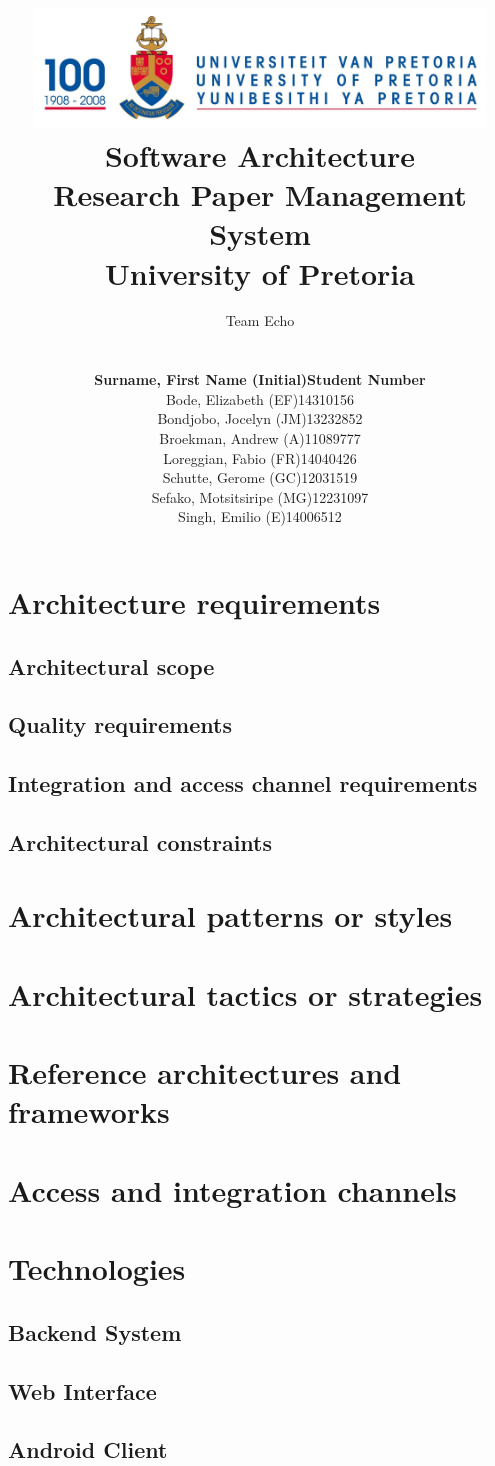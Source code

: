 \documentclass[a4paper,10pt]{article}
\title{\includegraphics[width=12cm]{Eeufeeslogo.jpg} \\
       Software Architecture \\
       Research Paper Management System \\
       \vspace{0.5cm}
       University of Pretoria \\
       \vspace{1.0cm}
       }
\date{}
\author{Team Echo\\
	\vspace{0.5cm} \\
	\begin{tabu} to \textwidth { X[l] X[l]}
		\hline
		\textbf{Surname, First Name (Initial)}	& \textbf{Student Number}	\\ \hline \hline
		Bode, Elizabeth (EF)			& 14310156		\\ \hline
		Bondjobo, Jocelyn (JM)		& 13232852		\\ \hline
		Broekman, Andrew (A)		& 11089777		\\ \hline
		Loreggian, Fabio (FR)			& 14040426		\\ \hline
		Schutte, Gerome (GC)		& 12031519		\\ \hline
		Sefako, Motsitsiripe (MG)		& 12231097		\\ \hline
		Singh, Emilio (E)			& 14006512		\\ \hline
		\hline
	\end{tabu}}
\begin{document}
\maketitle
\thispagestyle{empty}
\clearpage

\newpage
{}
\thispagestyle{empty}
\tableofcontents
\clearpage

\newpage
{}

\section{Architecture requirements}
\subsection{Architectural scope}
\subsection{Quality requirements}
\subsection{Integration and access channel requirements}
\subsection{Architectural constraints}

\section{Architectural patterns or styles}

\section{Architectural tactics or strategies}
 
\section{Reference architectures and frameworks}
 
\section{Access and integration channels}

\section{Technologies}
\subsection{Backend System}
\subsection{Web Interface}
\subsection{Android Client}
\end{document}
